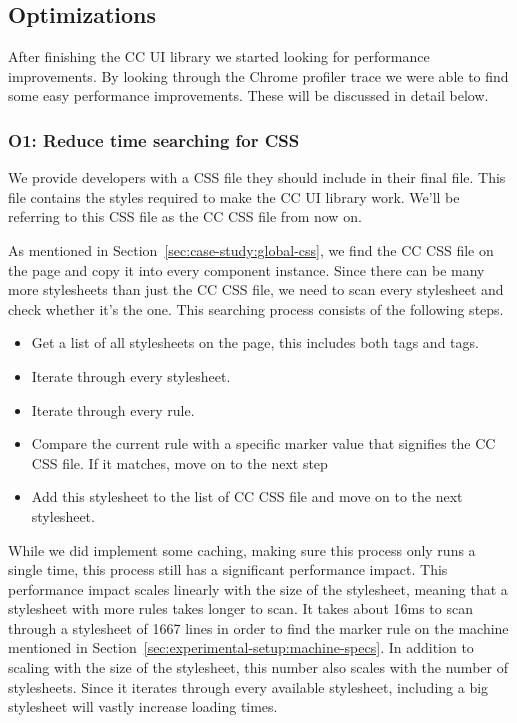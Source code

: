 \subsection{Optimizations}
After finishing the CC UI library we started looking for performance improvements. By looking through the Chrome profiler trace we were able to find some easy performance improvements. These will be discussed in detail below.

\subsubsection{O1: Reduce time searching for CSS}\label{sec:case-study:searching-for-css}
We provide developers with a CSS file they should include in their final  file. This file contains the styles required to make the CC UI library work. We'll be referring to this CSS file as the CC CSS file from now on.

As mentioned in Section~\ref{sec:case-study:global-css}, we find the CC CSS file on the page and copy it into every component instance. Since there can be many more stylesheets than just the CC CSS file, we need to scan every stylesheet and check whether it's the one. This searching process consists of the following steps.

\begin{itemize}
	\item Get a list of all stylesheets on the page, this includes both  tags and  tags.
	\item Iterate through every stylesheet.
	\item Iterate through every rule.
	\item Compare the current rule with a specific marker value that signifies the CC CSS file. If it matches, move on to the next step
	\item Add this stylesheet to the list of CC CSS file and move on to the next stylesheet.
\end{itemize}

While we did implement some caching, making sure this process only runs a single time, this process still has a significant performance impact. This performance impact scales linearly with the size of the stylesheet, meaning that a stylesheet with more rules takes longer to scan. It takes about 16ms to scan through a stylesheet of 1667 lines in order to find the marker rule on the machine mentioned in Section~\ref{sec:experimental-setup:machine-specs}. In addition to scaling with the size of the stylesheet, this number also scales with the number of stylesheets. Since it iterates through every available stylesheet, including a big stylesheet will vastly increase loading times.

